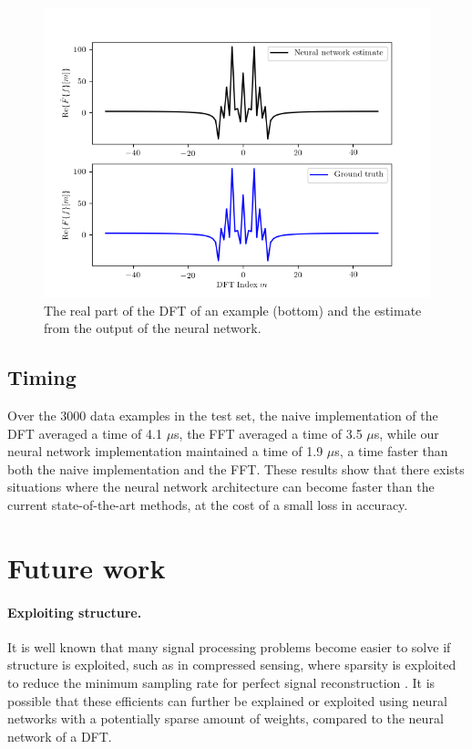 \documentclass[12pt]{article}
\begin{document}
\begin{figure}
\centering
\includegraphics[scale=.65]{figures/DFT_comparisons.png}
\caption{The real part of the DFT of an example (bottom) and the estimate from the output of the neural network.}
\label{f-DFT_compare}
\end{figure}

\subsection{Timing}
Over the 3000 data examples in the test set, the naive implementation of the DFT averaged a time of 4.1 $\mu$s,
the FFT averaged a time of 3.5 $\mu$s, while our neural network implementation maintained a time of 1.9 $\mu$s, a time
faster than both the naive implementation and the FFT. These results show that there exists situations where the neural
network architecture can become faster than the current state-of-the-art methods, at the cost of a small loss in accuracy.

\section{Future work}

\paragraph{Exploiting structure.} It is well known that many signal processing problems become easier to solve if structure is
exploited, such as in compressed sensing, where sparsity is exploited to reduce the minimum sampling rate for perfect signal
reconstruction \cite{D:06}. It is possible that these efficients can further be explained or exploited using neural networks
with a potentially sparse amount of weights, compared to the neural network of a DFT.
\end{document}
